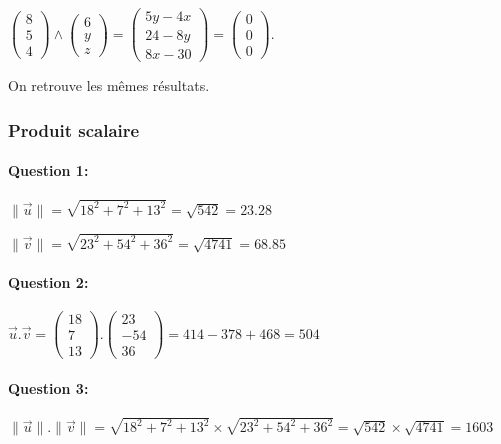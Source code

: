 $\left(\begin{array}{c}8 \\ 5 \\ 4 \end{array}\right) \wedge \left(\begin{array}{c}6 \\ y \\ z \end{array}\right)=\left(\begin{array}{c} 5y-4x \\ 24 - 8y \\ 8x-30 \end{array}\right)=\left(\begin{array}{c} 0 \\ 0 \\ 0 \end{array}\right)$.

On retrouve les mêmes résultats.

\subsubsection{Produit scalaire}

\paragraph{Question 1:} $\|\overrightarrow{u}\|=\sqrt{18^2+7^2+13^2}=\sqrt{542}=23.28$

$\|\overrightarrow{v}\|=\sqrt{23^2+54^2+36^2}=\sqrt{4741}=68.85$

\paragraph{Question 2:} $\overrightarrow{u}.\overrightarrow{v}=\left(\begin{array}{c} 18 \\ 7 \\ 13 \end{array}\right).\left(\begin{array}{c} 23 \\ -54 \\ 36 \end{array}\right)=414-378+468=504$

\paragraph{Question 3:} $\|\overrightarrow{u}\|.\|\overrightarrow{v}\|=\sqrt{18^2+7^2+13^2}\times \sqrt{23^2+54^2+36^2}=\sqrt{542}\times \sqrt{4741}=1603$

